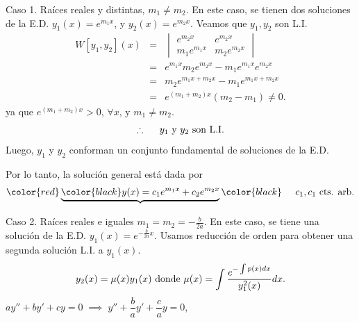 \documentclass{beamer}
\begin{document}
\begin{frame}[t]
	\begin{block}{Caso 1. Raíces reales y distintas, \(m_1 \ne m_2\).}
		En este caso, se tienen dos soluciones de la E.D. \(y_1(x) = e^{m_1x}\), y \(y_2(x) =e^{m_2x}\). Veamos que \(y_1,y_2\) son L.I.
		\[
			\begin{array}{rcl}
				W[y_1,y_2] (x) & = & \begin{vmatrix}
					e^{m_2x} & e^{m_2x} \\
					m_1e^{m_1x} & m_2e^{m_2x}
				\end{vmatrix}\\[2mm]
				& = & e^{m_1x} m_2e^{m_2x} -m_1e^{m_1x} e^{m_2x} \\[2mm]
				& = & m_2e^{m_1x+m_2x} -m_1e^{m_1x+m_2x} \\[2mm]
				& = & e^{(m_1+m_2) x} (m_2-m_1) \ne 0.
			\end{array}
		\]
		ya que \(e^{(m_1+m_2) x} >0\), \(\forall x\), y \(m_1 \ne m_2\).
		\[
			\therefore \hspace{5mm} y_1 \mbox{ y } y_2 \mbox{ son L.I.}
		\]
		Luego, \(y_1\) y \(y_2\) conforman un conjunto fundamental de soluciones de la E.D. 
	\end{block}
\end{frame}

\begin{frame}[t]
	\begin{block}{}
		Por lo tanto, la solución general está dada por
		\[
			\color{red} \underbrace{\color{black} y(x) = c_1e^{m_1x} + c_2e^{m_2 x}} \color{black} \hspace{5mm} c_1,c_1 \mbox{ cts. arb.}
		\]
	\end{block}
	\begin{block}{Caso 2. Raíces reales e iguales \(m_1=m_2 =- \frac{b}{2a}\).}
		En este caso, se tiene una solución de la E.D. \(y_1(x) = e^{- \frac{b}{2a}  x}\). Usamos reducción de orden para obtener una segunda solución L.I. a \(y_1(x)\).
		\[
			y_2(x) = \mu (x) y_1(x) \mbox{ donde } \mu (x) = \displaystyle\int \dfrac{e^{-\int p(x) dx}}{y_1^2(x)} dx.
		\]
		\(ay'' +by' +cy=0 \;\implies\; y'' + \dfrac{b}{a} y' + \dfrac{c}{a} y=0\),
	\end{block}
\end{frame}
\end{document}

